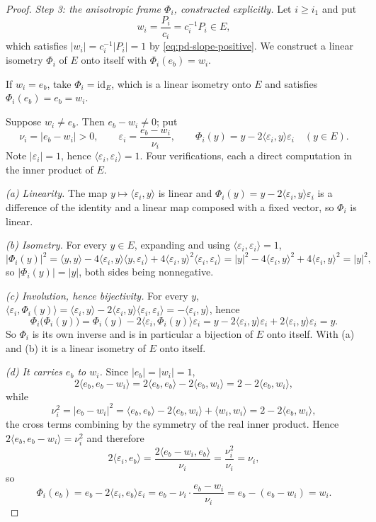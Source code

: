 \begin{proof}
\emph{Step 3: the anisotropic frame $\Phi_i$, constructed explicitly.}
Let $i\ge i_1$ and put
\[
  w_i=\frac{P_i}{c_i}=c_i^{-1}P_i\in E,
\]
which satisfies $|w_i|=c_i^{-1}|P_i|=1$ by \eqref{eq:pd-slope-positive}. We
construct a linear isometry $\Phi_i$ of $E$ onto itself with
$\Phi_i(e_b)=w_i$.

If $w_i=e_b$, take $\Phi_i=\mathrm{id}_E$, which is a linear isometry onto $E$
and satisfies $\Phi_i(e_b)=e_b=w_i$.

Suppose $w_i\ne e_b$. Then $e_b-w_i\ne0$; put
\[
  \nu_i=|e_b-w_i|>0,\qquad
  \varepsilon_i=\frac{e_b-w_i}{\nu_i},\qquad
  \Phi_i(y)=y-2\langle\varepsilon_i,y\rangle\varepsilon_i\quad(y\in E).
\]
Note $|\varepsilon_i|=1$, hence
$\langle\varepsilon_i,\varepsilon_i\rangle=1$. Four verifications, each a direct
computation in the inner product of $E$.

\emph{(a) Linearity.} The map $y\mapsto\langle\varepsilon_i,y\rangle$ is linear
and $\Phi_i(y)=y-2\langle\varepsilon_i,y\rangle\varepsilon_i$ is a difference of
the identity and a linear map composed with a fixed vector, so $\Phi_i$ is
linear.

\emph{(b) Isometry.} For every $y\in E$, expanding and using
$\langle\varepsilon_i,\varepsilon_i\rangle=1$,
\[
  \bigl|\Phi_i(y)\bigr|^2
   =\langle y,y\rangle-4\langle\varepsilon_i,y\rangle\langle y,\varepsilon_i\rangle
     +4\langle\varepsilon_i,y\rangle^2\langle\varepsilon_i,\varepsilon_i\rangle
   =|y|^2-4\langle\varepsilon_i,y\rangle^2+4\langle\varepsilon_i,y\rangle^2
   =|y|^2 ,
\]
so $|\Phi_i(y)|=|y|$, both sides being nonnegative.

\emph{(c) Involution, hence bijectivity.} For every $y$,
$\langle\varepsilon_i,\Phi_i(y)\rangle
 =\langle\varepsilon_i,y\rangle-2\langle\varepsilon_i,y\rangle
   \langle\varepsilon_i,\varepsilon_i\rangle=-\langle\varepsilon_i,y\rangle$,
hence
\[
  \Phi_i\bigl(\Phi_i(y)\bigr)
   =\Phi_i(y)-2\langle\varepsilon_i,\Phi_i(y)\rangle\varepsilon_i
   =y-2\langle\varepsilon_i,y\rangle\varepsilon_i
      +2\langle\varepsilon_i,y\rangle\varepsilon_i=y .
\]
So $\Phi_i$ is its own inverse and is in particular a bijection of $E$ onto
itself. With (a) and (b) it is a linear isometry of $E$ onto itself.

\emph{(d) It carries $e_b$ to $w_i$.} Since $|e_b|=|w_i|=1$,
\[
  2\langle e_b,e_b-w_i\rangle
   =2\langle e_b,e_b\rangle-2\langle e_b,w_i\rangle
   =2-2\langle e_b,w_i\rangle ,
\]
while
\[
  \nu_i^2=|e_b-w_i|^2
   =\langle e_b,e_b\rangle-2\langle e_b,w_i\rangle+\langle w_i,w_i\rangle
   =2-2\langle e_b,w_i\rangle ,
\]
the cross terms combining by the symmetry of the real inner product. Hence
$2\langle e_b,e_b-w_i\rangle=\nu_i^2$ and therefore
\[
  2\langle\varepsilon_i,e_b\rangle
   =\frac{2\langle e_b-w_i,e_b\rangle}{\nu_i}=\frac{\nu_i^2}{\nu_i}=\nu_i ,
\]
so
\[
  \Phi_i(e_b)=e_b-2\langle\varepsilon_i,e_b\rangle\varepsilon_i
   =e_b-\nu_i\cdot\frac{e_b-w_i}{\nu_i}=e_b-(e_b-w_i)=w_i .
\]


\end{proof}
